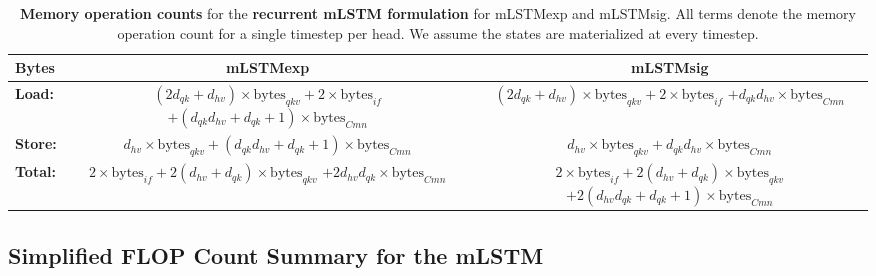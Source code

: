 \documentclass{article}
\begin{document}
    \begin{table}[H]
        \vspace{-0.3cm}
        \centering
        \caption{\label{tab:memop_counts_mlstm_recurrent} \textbf{Memory operation counts} for the \textbf{recurrent mLSTM formulation} for mLSTMexp and mLSTMsig.
            All terms denote the memory operation count for a single timestep per head. We assume the states are materialized at every timestep.}
        \vspace{0.2cm}
        \begin{adjustbox}{width=\textwidth}
        \begin{tabular}{lcc}
            \toprule
            Bytes           & mLSTMexp                                                                                    & mLSTMsig                                                                     \\
            \midrule
            \textbf{Load:}  & \thead{$(2d_{qk} + d_{hv}) \times \text{bytes}_{qkv} + 2 \times \text{bytes}_{if}$                                                                                         \\ $+ (d_{qk} d_{hv} + d_{qk} + 1) \times \text{bytes}_{Cmn}$} & \thead{$(2d_{qk} + d_{hv}) \times \text{bytes}_{qkv} + 2 \times \text{bytes}_{if}$ \\ $+ d_{qk} d_{hv}\times \text{bytes}_{Cmn}$} \\
            \textbf{Store:} & $d_{hv} \times \text{bytes}_{qkv} + (d_{qk} d_{hv} + d_{qk} + 1) \times \text{bytes}_{Cmn}$ & $d_{hv} \times \text{bytes}_{qkv} + d_{qk} d_{hv} \times \text{bytes}_{Cmn}$ \\
            \midrule[0.75pt]
            \textbf{Total:} & \thead{$ 2\times \text{bytes}_{if} + 2(d_{hv} + d_{qk}) \times \text{bytes}_{qkv}$                                                                                         \\$ + 2 d_{hv} d_{qk} \times \text{bytes}_{Cmn} $} & \thead{$ 2\times \text{bytes}_{if} + 2(d_{hv} + d_{qk}) \times \text{bytes}_{qkv}$ \\$ + 2 (d_{hv} d_{qk} + d_{qk} + 1) \times \text{bytes}_{Cmn} $}\\
            \bottomrule
        \end{tabular}
        \end{adjustbox}
        \vspace{-0.2cm}
    \end{table}

    \subsection{Simplified FLOP Count Summary for the mLSTM}
    \label{app:flops_mlstm_simplified}
\end{document}
